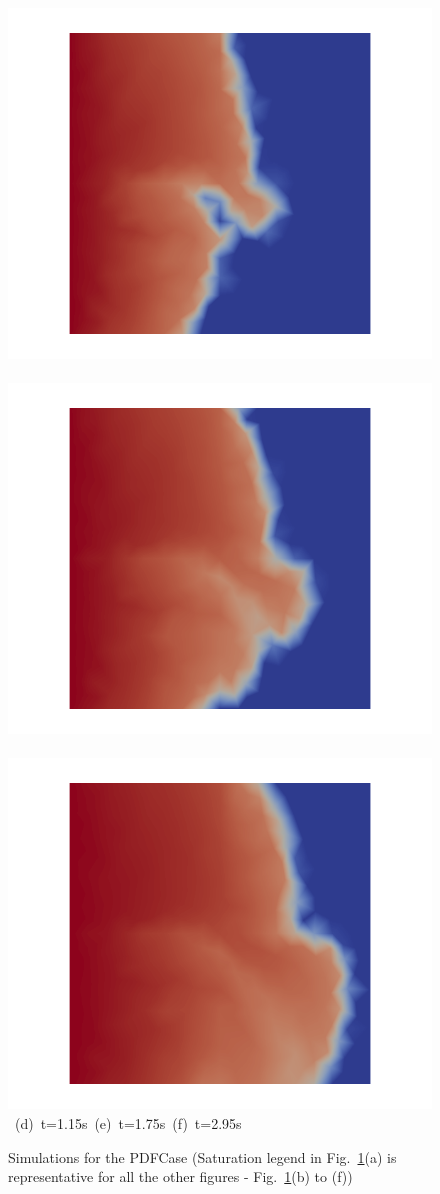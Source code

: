 \begin{landscape}
\begin{figure}[ht]
{\hbox{
      \includegraphics[width=.56\textwidth]{./Pics/PDFCase/PDFCase_Saturation_t_1dot15.png}
      \includegraphics[width=.56\textwidth]{./Pics/PDFCase/PDFCase_Saturation_t_1dot75.png} 
      \includegraphics[width=.56\textwidth]{./Pics/PDFCase/PDFCase_Saturation_t_2dot95.png}}
\vspace{0.cm}
\hbox{ \hspace{2.5cm} (d) t=1.15s \hspace{5.5cm} (e) t=1.75s   \hspace{5.5cm} (f) t=2.95s}
\vspace{0.cm}
}   
\caption{Simulations for the PDFCase (Saturation legend in Fig.~\ref{fig:PDFCase_Saturation}(a) is representative for all the other figures - \ie Fig.~\ref{fig:PDFCase_Saturation}(b) to (f))}
\label{fig:PDFCase_Saturation}
\end{figure}
\end{landscape}
\clearpage



